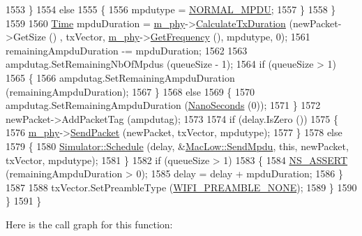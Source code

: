 \begin{DoxyCode}
1553                 \}
1554               \textcolor{keywordflow}{else}
1555                 \{
1556                   mpdutype = \hyperlink{namespacens3_ae617d41bbd0c07fa58ee2306f687b055a1fa7c2077d3b19b000b35004914f50eb}{NORMAL\_MPDU};
1557                 \}
1558             \}
1559 
1560           \hyperlink{namespacens3_1_1TracedValueCallback_a7ffd3e7c142ffe7c8a1d2db9b8de38ec}{Time} mpduDuration = \hyperlink{classns3_1_1MacLow_aec8aefec9501f9d7c06b6cd0ee1353ee}{m\_phy}->\hyperlink{classns3_1_1WifiPhy_aee98c7241bb4f0bb8e6d90f5771dacc7}{CalculateTxDuration} (newPacket->GetSize ()
      , txVector, \hyperlink{classns3_1_1MacLow_aec8aefec9501f9d7c06b6cd0ee1353ee}{m\_phy}->\hyperlink{classns3_1_1WifiPhy_ad2508d94faf22d690d6b8b4367934fd1}{GetFrequency} (), mpdutype, 0);
1561           remainingAmpduDuration -= mpduDuration;
1562 
1563           ampdutag.SetRemainingNbOfMpdus (queueSize - 1);
1564           \textcolor{keywordflow}{if} (queueSize > 1)
1565             \{
1566               ampdutag.SetRemainingAmpduDuration (remainingAmpduDuration);
1567             \}
1568           \textcolor{keywordflow}{else}
1569             \{
1570               ampdutag.SetRemainingAmpduDuration (\hyperlink{group__timecivil_ga281d64bcb4dad96267d83c7688ec433f}{NanoSeconds} (0));
1571             \}
1572           newPacket->AddPacketTag (ampdutag);
1573 
1574           \textcolor{keywordflow}{if} (delay.IsZero ())
1575             \{
1576               \hyperlink{classns3_1_1MacLow_aec8aefec9501f9d7c06b6cd0ee1353ee}{m\_phy}->\hyperlink{classns3_1_1WifiPhy_a4caf22eb334a9caca21ec37d90a74ce2}{SendPacket} (newPacket, txVector, mpdutype);
1577             \}
1578           \textcolor{keywordflow}{else}
1579             \{
1580               \hyperlink{classns3_1_1Simulator_a671882c894a08af4a5e91181bf1eec13}{Simulator::Schedule} (delay, &\hyperlink{classns3_1_1MacLow_a0ec344c3a1200d8d66273614949c6b35}{MacLow::SendMpdu}, \textcolor{keyword}{this}, 
      newPacket, txVector, mpdutype);
1581             \}
1582           \textcolor{keywordflow}{if} (queueSize > 1)
1583             \{
1584               \hyperlink{assert_8h_a6dccdb0de9b252f60088ce281c49d052}{NS\_ASSERT} (remainingAmpduDuration > 0);
1585               delay = delay + mpduDuration;
1586             \}
1587 
1588           txVector.SetPreambleType (\hyperlink{group__wifi_gga5e94a56cb338a14ffbbb19c6a41251eba97c5c71995de5f28931200e6d5a38a66}{WIFI\_PREAMBLE\_NONE});
1589         \}
1590     \}
1591 \}
\end{DoxyCode}


Here is the call graph for this function\+:




